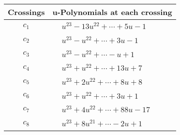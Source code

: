 \documentclass[1p]{elsarticle_modified}
\theoremstyle{definition}
\begin{document}
\begin{tabular}{m{50pt}|m{274pt}}
Crossings & \hspace{64pt}u-Polynomials at each crossing \\
\hline $$\begin{aligned}c_{1}\end{aligned}$$&$\begin{aligned}
&u^{23}-13 u^{22}+\cdots+5 u-1
\end{aligned}$\\
\hline $$\begin{aligned}c_{2}\end{aligned}$$&$\begin{aligned}
&u^{23}- u^{22}+\cdots+3 u-1
\end{aligned}$\\
\hline $$\begin{aligned}c_{3}\end{aligned}$$&$\begin{aligned}
&u^{23}- u^{22}+\cdots- u+1
\end{aligned}$\\
\hline $$\begin{aligned}c_{4}\end{aligned}$$&$\begin{aligned}
&u^{23}+u^{22}+\cdots+13 u+7
\end{aligned}$\\
\hline $$\begin{aligned}c_{5}\end{aligned}$$&$\begin{aligned}
&u^{23}+2 u^{22}+\cdots+8 u+8
\end{aligned}$\\
\hline $$\begin{aligned}c_{6}\end{aligned}$$&$\begin{aligned}
&u^{23}+u^{22}+\cdots+3 u+1
\end{aligned}$\\
\hline $$\begin{aligned}c_{7}\end{aligned}$$&$\begin{aligned}
&u^{23}+4 u^{22}+\cdots+88 u-17
\end{aligned}$\\
\hline $$\begin{aligned}c_{8}\end{aligned}$$&$\begin{aligned}
&u^{23}+8 u^{21}+\cdots-2 u+1
\end{aligned}$\\

\end{tabular}
\end{document}
